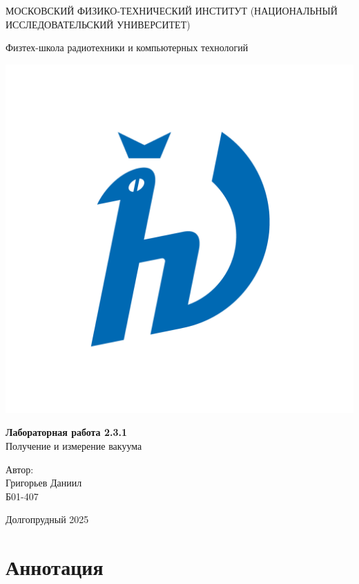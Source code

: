 \documentclass[a4paper,12pt]{article}
\begin{document}
\begin{titlepage}
\begin{center}
    {\large МОСКОВСКИЙ ФИЗИКО-ТЕХНИЧЕСКИЙ ИНСТИТУТ (НАЦИОНАЛЬНЫЙ ИССЛЕДОВАТЕЛЬСКИЙ УНИВЕРСИТЕТ)}
\end{center}

\begin{center}
    {\large Физтех-школа радиотехники и компьютерных технологий}
\end{center}

\vspace{3.5cm}

\begin{center}
    \includegraphics[width=0.4\linewidth]{hv_full.png}
\end{center}

\vspace{0.1cm}

{\huge
\begin{center}
    {\bf Лабораторная работа 2.3.1}\\
    Получение и измерение вакуума
\end{center}
}

\vspace{2cm}

\begin{flushright}
{\LARGE Автор:\\ Григорьев Даниил \\
\vspace{0.2cm}
Б01-407}
\end{flushright}

\vspace{3.5cm}
\begin{center}
    Долгопрудный 2025
\end{center}
\end{titlepage}

\section{Аннотация}
\end{document}

